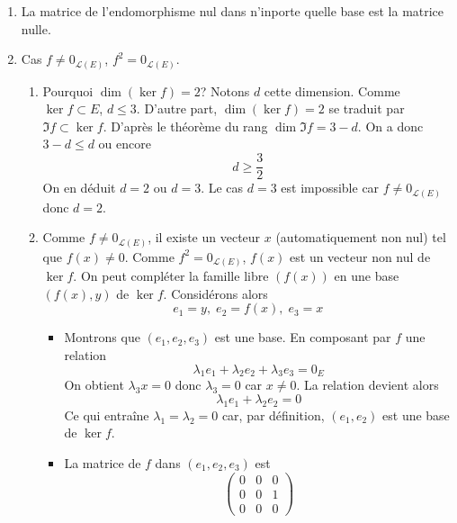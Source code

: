\begin{enumerate}
 \item La matrice de l'endomorphisme nul dans n'inporte quelle base est la matrice nulle.
\item Cas $f\neq 0_{\mathcal L (E)}$, $f^2 = 0_{\mathcal L (E)}$.
\begin{enumerate}
 \item Pourquoi $\dim (\ker f)=2$?\newline
Notons $d$ cette dimension. Comme $\ker f \subset E$, $d\leq 3$.\newline
D'autre part, $\dim (\ker f)=2$ se traduit par $\Im f \subset \ker f$. D'après le théorème du rang $\dim \Im f =3-d$. On a donc $3-d\leq d$ ou encore
\begin{displaymath}
 d\geq \frac{3}{2}
\end{displaymath}
On en déduit $d=2$ ou $d=3$. Le cas $d=3$ est impossible car $f\neq 0_{\mathcal L (E)}$ donc $d=2$.
\item Comme $f\neq 0_{\mathcal L (E)}$, il existe un vecteur $x$ (automatiquement non nul) tel que $f(x)\neq 0$. Comme $f^2= 0_{\mathcal L (E)}$, $f(x)$ est un vecteur non nul de $\ker f$. On peut compléter la famille libre $(f(x))$ en une base $(f(x),y)$ de $\ker f$.\newline
Considérons alors
\begin{displaymath}
 e_1=y,\; e_2=f(x),\; e_3=x
\end{displaymath}
\begin{itemize}
 \item Montrons que $(e_1,e_2,e_3)$ est une base. En composant par $f$ une relation
\begin{displaymath}
 \lambda_1 e_1 +\lambda_2 e_2 +\lambda_3 e_3 = 0_E
\end{displaymath}
On obtient $\lambda_3 x=0$ donc $\lambda_3=0$ car $x\neq 0$. La relation devient alors
\begin{displaymath}
 \lambda_1 e_1 +\lambda_2 e_2  = 0
\end{displaymath}
Ce qui entraîne $\lambda_1=\lambda_2=0$ car, par définition, $(e_1,e_2)$ est une base de $\ker f$.
\item La matrice de $f$ dans $(e_1,e_2,e_3)$ est
\begin{displaymath}
\begin{pmatrix}
0 & 0 & 0 \\ 
0 & 0 & 1 \\ 
0 & 0 & 0
\end{pmatrix}
\end{displaymath}
\end{itemize}
\end{enumerate}


\end{enumerate}
